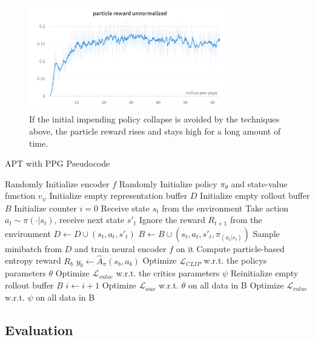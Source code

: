 \documentclass{article}
\begin{document}
\begin{figure}[h]
  \centering
  \includegraphics[width = 250pt]{part_rew.png}
  \caption{If the initial impending policy collapse is avoided by the techniques above, the particle reward rises and
  stays high for a long amount of time.}
\end{figure}

\begin{algorithm}[H]
\begin{algorithmic}[1]
\caption{APT with PPG Pseudocode}
\State Randomly Initialize encoder $f$
\State Randomly Initialize policy $\pi_\theta$ and state-value function $v_\psi$
\State Initialize empty representation buffer $D$
\State Initialize empty rollout buffer $B$
\State Initialize counter $i = 0$
    \State Receive state $s_t$ from the environment
    \State Take action $a_t \sim \pi(\cdot|s_t)$, receive next state $s'_t$
    \State Ignore the reward $R_{t+1}$ from the environment
    \State $D \gets D \cup (s_t, a_t, s'_t)$
    \State $B \gets B \cup (s_t, a_t, s'_t, \pi_(a_t|s_t))$
    \State Sample minibatch from $D$ and train neural encoder $f$ on it
            \State Compute particle-based entropy reward $R_{b}$
            \State $y_{b} \gets \hat A_\pi(s_{b}, a_{b})$
            \State Optimize $\mathcal{L}_{CLIP}$ w.r.t. the policys parameters $\theta$
            \State Optimize $\mathcal{L}_{value}$ w.r.t. the critics parameters $\psi$
        \EndFor
    \State Reinitialize empty rollout buffer $B$
    \State $i \gets i + 1$
    \EndIf
            \State Optimize $\mathcal{L}_{aux}$ w.r.t. $\theta$ on all data in B
            \State Optimize $\mathcal{L}_{value}$ w.r.t. $\psi$ on all data in B
        \EndFor
    \EndIf
\EndFor
\end{algorithmic}
\end{algorithm}

\subsection{Evaluation}
\end{document}
